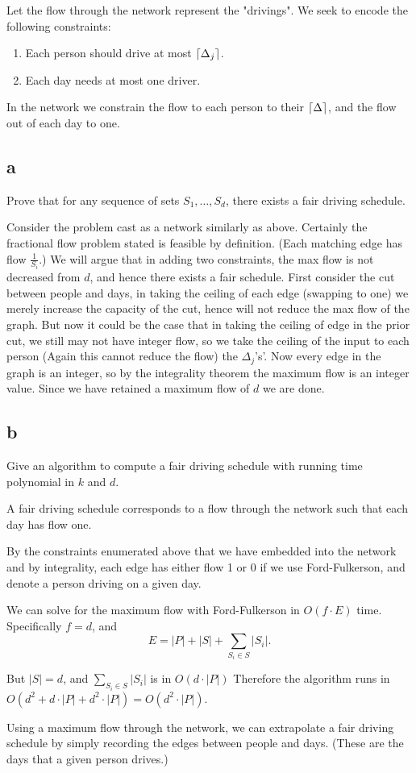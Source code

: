 \documentclass{amsart}
\theoremstyle{definition}
\theoremstyle{remark}
\numberwithin{equation}{section}
\DeclarePairedDelimiter{\ceil}{\lceil}{\rceil}
\begin{document}
Let the flow through the network represent the "drivings". We seek to encode the following constraints:
\begin{enumerate}
  \item Each person should drive at most $\ceil{\Delta_j}$.
  \item Each day needs at most one driver.
\end{enumerate}

In the network we constrain the flow to each person to their $\ceil{\Delta}$, and the flow out of each day to one.
\subsection*{a}
Prove that for any sequence of sets $S_1, \ldots , S_d$, there exists a fair driving schedule.

\proof Consider the problem cast as a network similarly as above. Certainly the fractional flow problem stated is feasible by definition. (Each matching edge has flow $\frac{1}{S_i}$.) We will argue that in adding two constraints, the max flow is not decreased from $d$, and hence there exists a fair schedule. First consider the cut between people and days, in taking the ceiling of each edge (swapping to one) we merely increase the capacity of the cut, hence will not reduce the max flow of the graph. But now it could be the case that in taking the ceiling of edge in the prior cut, we still may not have integer flow, so we take the ceiling of the input to each person (Again this cannot reduce the flow) the $\Delta_j$'s'. Now every edge in the graph is an integer, so by the integrality theorem the maximum flow is an integer value. Since we have retained a maximum flow of $d$ we are done.

\subsection*{b}
Give an algorithm to compute a fair driving schedule with running time polynomial in $k$ and $d$.


\claimstar A fair driving schedule corresponds to a flow through the network such that each day has flow one.

\proof By the constraints enumerated above that we have embedded into the network and by integrality, each edge has either flow 1 or 0 if we use Ford-Fulkerson, and denote a person driving on a given day.


\rmkstar We can solve for the maximum flow with Ford-Fulkerson in $O(f \cdot E)$ time. Specifically $f=d$, and
$$E= |P| + |S| + \sum_{S_i \in S} |S_i|.$$

But $|S|=d$, and $\sum_{S_i \in S} |S_i|$ is in $O(d \cdot |P|)$ Therefore the algorithm runs in $O(d^2 + d \cdot |P| + d^2 \cdot |P|) = O(d^2 \cdot |P|)$.

\rmkstar Using a maximum flow through the network, we can extrapolate a fair driving schedule by simply recording the edges between people and days. (These are the days that a given person drives.)
\end{document}
